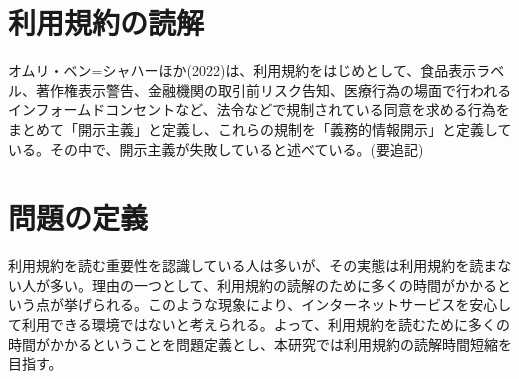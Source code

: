\section{利用規約の読解}
オムリ・ベン=シャハーほか(2022)\cite{sonokiyaku2022}は、利用規約をはじめとして、食品表示ラベル、著作権表示警告、金融機関の取引前リスク告知、医療行為の場面で行われるインフォームドコンセントなど、法令などで規制されている同意を求める行為をまとめて「開示主義」と定義し、これらの規制を「義務的情報開示」と定義している。その中で、開示主義が失敗していると述べている。(要追記)

\section{問題の定義}
利用規約を読む重要性を認識している人は多いが、その実態は利用規約を読まない人が多い。理由の一つとして、利用規約の読解のために多くの時間がかかるという点が挙げられる。このような現象により、インターネットサービスを安心して利用できる環境ではないと考えられる。よって、利用規約を読むために多くの時間がかかるということを問題定義とし、本研究では利用規約の読解時間短縮を目指す。


